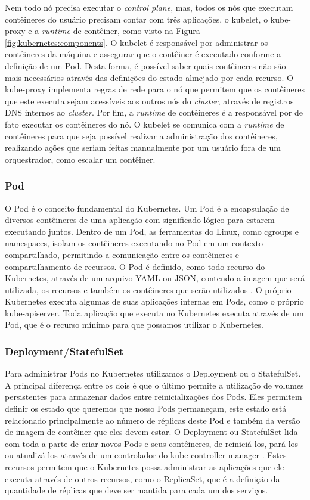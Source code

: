 Nem todo nó precisa executar o \textit{control plane}, mas, todos os nós que
executam contêineres do usuário precisam contar com três aplicações, o kubelet,
o kube-proxy e a \textit{runtime} de contêiner, como visto na Figura
\ref{fig:kubernetes:components}. O kubelet é responsável por administrar os
contêineres da máquina e assegurar que o contêiner é executado conforme a
definição de um Pod. Desta forma, é possível saber quais contêineres não são mais
necessários através das definições do estado almejado por cada recurso. O
kube-proxy implementa regras de rede para o nó que permitem que os contêineres
que este executa sejam acessíveis aos outros nós do \textit{cluster}, através
de registros DNS internos ao \textit{cluster}. Por fim, a \textit{runtime} de
contêineres é a responsável por de fato executar os contêineres do nó. O kubelet
se comunica com a \textit{runtime} de contêineres para que seja possível realizar
a administração dos contêineres, realizando ações que seriam feitas manualmente
por um usuário fora de um orquestrador, como escalar um contêiner.

\subsubsection{Pod}

O Pod é o conceito fundamental do Kubernetes. Um Pod é a encapsulação de
diversos contêineres de uma aplicação com significado lógico para estarem
executando juntos. Dentro de um Pod, as ferramentas do Linux, como cgroups e
namespaces, isolam os contêineres executando no Pod em um contexto
compartilhado, permitindo a comunicação entre os contêineres e compartilhamento
de recursos. O Pod é definido, como todo recurso do Kubernetes, através de um
arquivo YAML ou JSON, contendo a imagem que será utilizada, os recursos e
também os contêineres que serão utilizados \cite{kubernetes:pod}. O próprio
Kubernetes executa algumas de suas aplicações internas em Pods, como o próprio
kube-apiserver. Toda aplicação que executa no Kubernetes executa através de um
Pod, que é o recurso mínimo para que possamos utilizar o Kubernetes.

\subsubsection{Deployment/StatefulSet}

Para administrar Pods no Kubernetes utilizamos o Deployment ou o StatefulSet.
A principal diferença entre os dois é que o último permite a utilização de
volumes persistentes para armazenar dados entre reinicializações dos Pods.
Eles permitem definir os estado que queremos que nosso Pods permaneçam, este
estado está relacionado principalmente ao número de réplicas deste Pod e
também da versão de imagem de contêiner que eles devem estar. O Deployment
ou StatefulSet lida com toda a parte de criar novos Pods e seus contêineres,
de reiniciá-los, pará-los ou atualizá-los através de um controlador do
kube-controller-manager \cite{kubernetes:deployment}. Estes recursos permitem
que o Kubernetes possa administrar as aplicações que ele executa através de
outros recursos, como o ReplicaSet, que é a definição da quantidade de réplicas
que deve ser mantida para cada um dos serviços.

